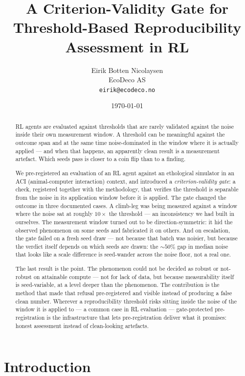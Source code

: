 \documentclass{article}
\title{A Criterion-Validity Gate for Threshold-Based Reproducibility Assessment in RL}
\author{
Eirik Botten Nicolaysen\\
EcoDeco AS\\
\texttt{eirik@ecodeco.no}
}
\date{\today}
\begin{document}
\maketitle

\begin{abstract}
RL agents are evaluated against thresholds that are rarely validated against the noise inside their own measurement window. A threshold can be meaningful against the outcome span and at the same time noise-dominated in the window where it is actually applied --- and when that happens, an apparently clean result is a measurement artefact. Which seeds pass is closer to a coin flip than to a finding.

We pre-registered an evaluation of an RL agent against an ethological simulator in an ACI (animal-computer interaction) context, and introduced a \emph{criterion-validity gate}: a check, registered together with the methodology, that verifies the threshold is separable from the noise in its application window before it is applied. The gate changed the outcome in three documented cases. A climb-leg was being measured against a window where the noise sat at roughly $10\times$ the threshold --- an inconsistency we had built in ourselves. The measurement window turned out to be direction-symmetric: it hid the observed phenomenon on some seeds and fabricated it on others. And on escalation, the gate failed on a fresh seed draw --- not because that batch was noisier, but because the verdict itself depends on which seeds are drawn: the $\sim 50\%$ gap in median noise that looks like a scale difference is seed-wander across the noise floor, not a real one.

The last result is the point. The phenomenon could not be decided as robust or not-robust on attainable compute --- not for lack of data, but because measurability itself is seed-variable, at a level deeper than the phenomenon. The contribution is the method that made that refusal pre-registered and visible instead of producing a false clean number. Wherever a reproducibility threshold risks sitting inside the noise of the window it is applied to --- a common case in RL evaluation --- gate-protected pre-registration is the infrastructure that lets pre-registration deliver what it promises: honest assessment instead of clean-looking artefacts.
\end{abstract}

\section{Introduction}
\end{document}
